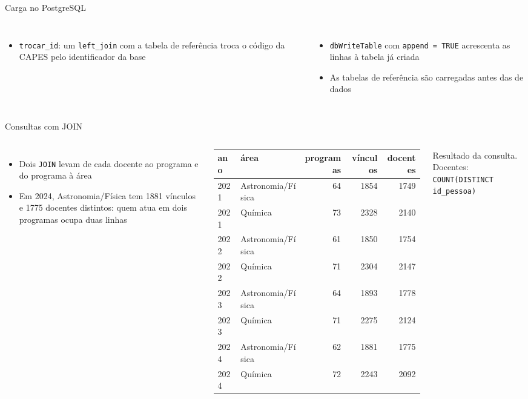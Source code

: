 \documentclass[aspectratio=169,10pt]{beamer}
\newcommand{\trecho}[2][codigo]{}
\newcommand{\fonte}[1]{{\scriptsize\color{cinza}#1}}
\newcommand{\cod}[1]{\texttt{#1}}
\begin{document}
\begin{frame}{Carga no PostgreSQL}
  \trecho[codigocarga]{base_trocar_id.R}
  \trecho[codigocarga]{base_gravar.R}
  \trecho[codigocarga]{base_docente.R}
  \small
  \begin{columns}[T]
    \begin{itemize}
      \item \cod{trocar\_id}: um \cod{left\_join} com a tabela de referência troca o código da CAPES pelo identificador da base
    \end{itemize}
    \begin{itemize}
      \item \cod{dbWriteTable} com \cod{append = TRUE} acrescenta as linhas à tabela já criada
      \item As tabelas de referência são carregadas antes das de dados
    \end{itemize}
  \end{columns}
\end{frame}

\begin{frame}{Consultas com JOIN}
  \begin{columns}[T]
    \trecho[codigosql]{base_consulta.sql}
    \vspace{0.8em}
    \begin{itemize}
      \item Dois \cod{JOIN} levam de cada docente ao programa e do programa à área
      \item Em 2024, Astronomia/Física tem 1881 vínculos e 1775 docentes distintos: quem atua em dois programas ocupa duas linhas
    \end{itemize}
    \centering\scriptsize\setlength{\tabcolsep}{3.2pt}
    \begin{tabular}{@{}llrrr@{}}
      \toprule
      ano & área & programas & vínculos & docentes \\
      \midrule
      2021 & Astronomia/Física & 64 & 1854 & 1749 \\
      2021 & Química           & 73 & 2328 & 2140 \\
      2022 & Astronomia/Física & 61 & 1850 & 1754 \\
      2022 & Química           & 71 & 2304 & 2147 \\
      2023 & Astronomia/Física & 64 & 1893 & 1778 \\
      2023 & Química           & 71 & 2275 & 2124 \\
      2024 & Astronomia/Física & 62 & 1881 & 1775 \\
      2024 & Química           & 72 & 2243 & 2092 \\
      \bottomrule
    \end{tabular}

    \vspace{0.6em}
    \fonte{Resultado da consulta. Docentes: \cod{COUNT(DISTINCT id\_pessoa)}}
  \end{columns}
\end{frame}
\end{document}
